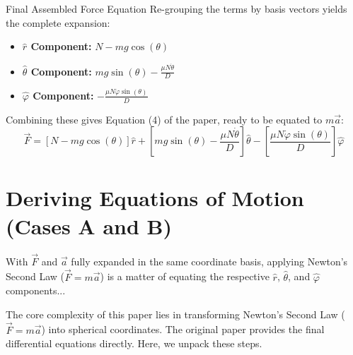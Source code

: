 \documentclass[11pt,letterpaper]{article}
\begin{document}
\begin{equationbreakdown}{Final Assembled Force Equation}
Re-grouping the terms by basis vectors yields the complete expansion:
\begin{itemize}
    \item \textbf{$\hat{r}$ Component:} $N - mg\cos(\theta)$
    \item \textbf{$\hat{\theta}$ Component:} $mg\sin(\theta) - \frac{\mu N\dot{\theta}}{D}$
    \item \textbf{$\hat{\varphi}$ Component:} $-\frac{\mu N\dot{\varphi}\sin(\theta)}{D}$
\end{itemize}
Combining these gives Equation (4) of the paper, ready to be equated to $m\vec{a}$:
\begin{equation}\label{eq:total_force}
\vec{F} = \left[N - mg\cos(\theta)\right]\hat{r} + \left[mg\sin(\theta) - \frac{\mu N\dot{\theta}}{D}\right]\hat{\theta} - \left[\frac{\mu N\dot{\varphi}\sin(\theta)}{D}\right]\hat{\varphi}
\end{equation}
\end{equationbreakdown}

\section{Deriving Equations of Motion (Cases A and B)}
With $\vec{F}$ and $\vec{a}$ fully expanded in the same coordinate basis, applying Newton's Second Law ($\vec{F} = m\vec{a}$) is a matter of equating the respective $\hat{r}$, $\hat{\theta}$, and $\hat{\varphi}$ components...

The core complexity of this paper lies in transforming Newton's Second Law ($\vec{F} = m\vec{a}$) into spherical coordinates. The original paper provides the final differential equations directly. Here, we unpack these steps.
\end{document}
